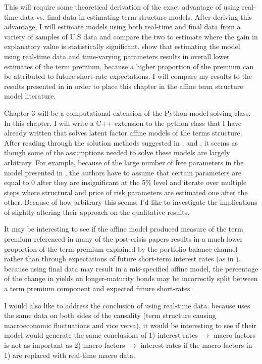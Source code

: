 \documentclass{article}
\numberwithin{equation}{section}
\begin{document}
This will require some theoretical derivation of the exact advantage of using
real-time data vs. final-data in estimating term structure models. After
deriving this advantage, I will estimate models using both real-time and final
data from a variety of samples of U.S data and compare the two to estimate
where the gain in explanatory value is statistically significant.
\citet{orphanideswei2010} show that estimating the model using real-time data
and time-varying parameters results in overall lower estimates of the term
premium, because a higher proportion of the premium can be attributed to future
short-rate expectations. I will compare my results to the results presented in
\citet{orphanideswei2010} in order to place this chapter in the affine term
structure model literature.

Chapter 3 will be a computational extension of the Python model solving class.
In this chapter, I will write a C++ extension to the python class that I have
already written that solves latent factor affine models of the terms structure.
After reading through the solution methods suggested in
\citet{daisingleton2000}, \citet{ang2003no} and \citet{duffee2004estimation},
it seems as though some of the assumptions needed to solve these models are
largely arbitrary. For example, because of the large number of free parameters
in the model presented in \citet{ang2003no}, the authors have to assume that
certain parameters are equal to 0 after they are insignificant at the 5\% level
and iterate over multiple steps where structural and price of risk parameters
are estimated one after the other. Because of how arbitrary this seems, I'd
like to investigate the implications of slightly altering their approach on the
qualitative results.

It may be interesting to see if the affine model produced measure of the term
premium referenced in many of the post-crisis papers results in a much lower
proportion of the term premium explained by the portfolio balance channel
rather than through expectations of future short-term interest rates (as in
\citet{bauerrudebusch2011}). because using final data may result in
a mis-specified affine model, the percentage of the change in yields on
longer-maturity bonds may be incorrectly split between a term premium component
and expected future short-rates.

I would also like to address the conclusion of \citet{diebold2006macroeconomy}
using real-time data. because \citet{diebold2006macroeconomy} uses the same
data on both sides of the causality (term structure causing macroeconomic
fluctuations and vice versa), it would be interesting to see if their model would
generate the same conclusions of 1) interest rates $\rightarrow$ macro factors
is not as important as 2) macro factors $\rightarrow$ interest rates if the
macro factors in 1) are replaced with real-time macro data.
\end{document}
